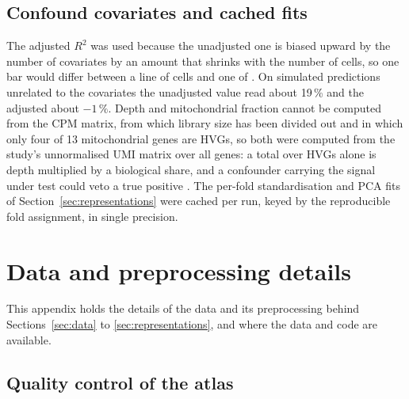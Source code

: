 \section{Confound covariates and cached fits}
\label{app:confounds}

The adjusted $R^2$ was used because the unadjusted one is biased upward by the number of covariates by an
amount that shrinks with the number of cells, so one bar would differ between a line of \CellsMin{} cells and one
of \CellsMax{}. On simulated predictions unrelated to the covariates the unadjusted value read about 19\,\%
and the adjusted about $-1\,\%$. Depth and mitochondrial fraction cannot be computed from the CPM matrix,
from which library size has been divided out and in which only four of 13 mitochondrial genes are
HVGs, so both were computed from the study's unnormalised UMI matrix over all genes: a total over HVGs
alone is depth multiplied by a biological share, and a confounder carrying the signal under test could
veto a true positive \cite{scp542,luecken2019}.
The per-fold standardisation and PCA fits of Section~\ref{sec:representations} were cached per run,
keyed by the reproducible fold assignment, in single precision.

\chapter{Data and preprocessing details}
\label{app:data}

This appendix holds the details of the data and its preprocessing behind Sections~\ref{sec:data} to
\ref{sec:representations}, and where the data and code are available.

\section{Quality control of the atlas}
\label{app:qc}

